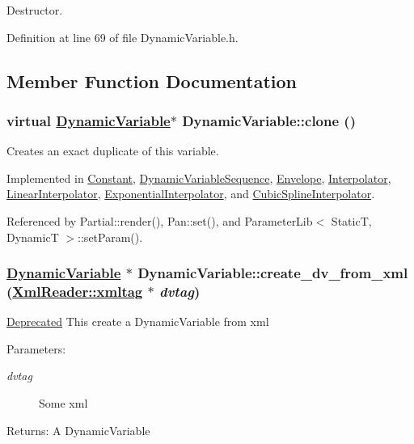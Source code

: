 Destructor. 

Definition at line 69 of file Dynamic\-Variable.h.

\subsection{Member Function Documentation}
\hypertarget{classDynamicVariable_a2}{
\subsubsection[clone]{\setlength{\rightskip}{0pt plus 5cm}virtual \hyperlink{classDynamicVariable}{Dynamic\-Variable}$\ast$ Dynamic\-Variable::clone ()}}
\label{classDynamicVariable_a2}


Creates an exact duplicate of this variable. 

Implemented in \hyperlink{classConstant_a1}{Constant}, \hyperlink{classDynamicVariableSequence_a4}{Dynamic\-Variable\-Sequence}, \hyperlink{classEnvelope_a5}{Envelope}, \hyperlink{classInterpolator_a1}{Interpolator}, \hyperlink{classLinearInterpolator_a1}{Linear\-Interpolator}, \hyperlink{classExponentialInterpolator_a1}{Exponential\-Interpolator}, and \hyperlink{classCubicSplineInterpolator_a1}{Cubic\-Spline\-Interpolator}.

Referenced by Partial::render(), Pan::set(), and Parameter\-Lib$<$ Static\-T, Dynamic\-T $>$::set\-Param().\hypertarget{classDynamicVariable_e0}{
\subsubsection[create\_\-dv\_\-from\_\-xml]{\setlength{\rightskip}{0pt plus 5cm}\hyperlink{classDynamicVariable}{Dynamic\-Variable} $\ast$ Dynamic\-Variable::create\_\-dv\_\-from\_\-xml (\hyperlink{classXmlReader_1_1xmltag}{Xml\-Reader::xmltag} $\ast$ {\em dvtag})}}
\label{classDynamicVariable_e0}


\begin{Desc}
\item[\hyperlink{deprecated__deprecated000009}{Deprecated}]This create a Dynamic\-Variable from xml\end{Desc}
\begin{Desc}
\item[Parameters:]
\begin{description}
\item[{\em dvtag}]Some xml \end{description}
\end{Desc}
\begin{Desc}
\item[Returns:]A Dynamic\-Variable \end{Desc}


